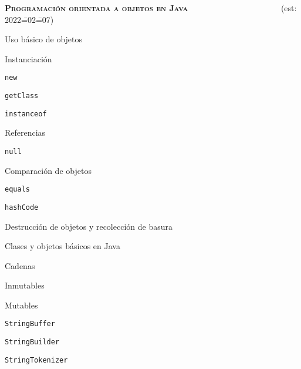 \begin{longenum}
\begin{longenum}
\begin{longenum}
        \end{longenum}
    \end{longenum}
    \item \textbf{\textsc{Programación orientada a objetos en Java}} \ \ \ \ \ \ \ \ \ \ \ \ \ \ \ \ \ \ \ \ \ \ (est: 2022\==02\==07)
    \begin{longenum}
        \item Uso básico de objetos
        \begin{longenum}
            \item Instanciación
            \begin{longenum}
                \item \texttt{new}
                \item \texttt{getClass}
                \item \texttt{instanceof}
            \end{longenum}
            \item Referencias
            \begin{longenum}
                \item \texttt{null}
            \end{longenum}
            \item Comparación de objetos
            \begin{longenum}
                \item \texttt{equals}
                \item \texttt{hashCode}
            \end{longenum}
            \item Destrucción de objetos y recolección de basura
        \end{longenum}
        \item Clases y objetos básicos en Java
        \begin{longenum}
            \item Cadenas
            \begin{longenum}
                \item Inmutables
                \item Mutables
                \begin{longenum}
                    \item \texttt{StringBuffer}
                    \item \texttt{StringBuilder}
                    \item \texttt{StringTokenizer}

\end{longenum}
\end{longenum}
\end{longenum}
\end{longenum}
\end{longenum}
